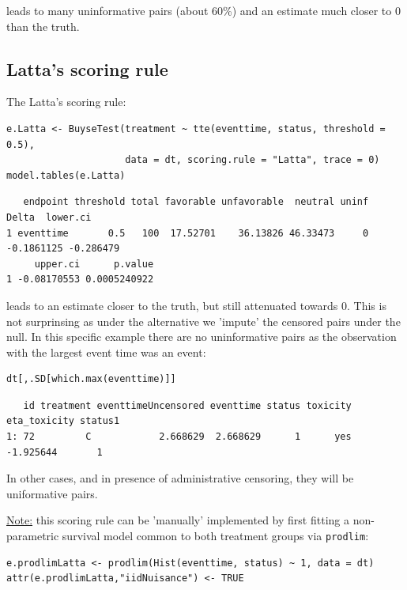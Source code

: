 \documentclass[12pt]{article}
\begin{document}
leads to many uninformative pairs (about 60\%) and an estimate much
closer to 0 than the truth.

\subsection{Latta's scoring rule}
\label{sec:orgbc1a6ad}

The Latta's scoring rule:
\lstset{language=r,label= ,caption= ,captionpos=b,numbers=none}
\begin{lstlisting}
e.Latta <- BuyseTest(treatment ~ tte(eventtime, status, threshold = 0.5),
                     data = dt, scoring.rule = "Latta", trace = 0)
model.tables(e.Latta)
\end{lstlisting}

\begin{verbatim}
   endpoint threshold total favorable unfavorable  neutral uninf      Delta  lower.ci
1 eventtime       0.5   100  17.52701    36.13826 46.33473     0 -0.1861125 -0.286479
     upper.ci      p.value
1 -0.08170553 0.0005240922
\end{verbatim}


leads to an estimate closer to the truth, but still attenuated
towards 0. This is not surprinsing as under the alternative we
'impute' the censored pairs under the null. In this specific example
there are no uninformative pairs as the observation with the largest
event time was an event:
\lstset{language=r,label= ,caption= ,captionpos=b,numbers=none}
\begin{lstlisting}
dt[,.SD[which.max(eventtime)]]
\end{lstlisting}

\begin{verbatim}
   id treatment eventtimeUncensored eventtime status toxicity eta_toxicity status1
1: 72         C            2.668629  2.668629      1      yes    -1.925644       1
\end{verbatim}


In other cases, and in presence of administrative censoring, they will
  be uniformative pairs.

\noindent \uline{Note:} this scoring rule can be 'manually' implemented by
first fitting a non-parametric survival model common to both treatment
groups via \texttt{prodlim}:
\lstset{language=r,label= ,caption= ,captionpos=b,numbers=none}
\begin{lstlisting}
e.prodlimLatta <- prodlim(Hist(eventtime, status) ~ 1, data = dt)
attr(e.prodlimLatta,"iidNuisance") <- TRUE
\end{lstlisting}
\end{document}
